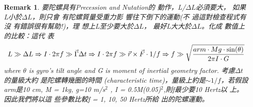 \documentclass[12pt,twoside]{article}
\newtheorem{remark}[theorem]{Remark}
\begin{document}
\begin{remark}
要陀螺具有Precession and Nutation的%
動作，L/$\Delta L$必須要大，%
如果L小於$\Delta L$，則只會%
有陀螺質量受重力影%
響往下倒下的運動(不%
過這對檢查程式有沒%
有錯誤很有幫助!)，理%
想上L至少要大於$\Delta L$，%
最好L大大於$\Delta L$。化成%
數值上的比較：這代%
表%
\begin{equation}
L\gg \Delta L\Rightarrow I\cdot 2\pi f\gg \vec{\Gamma}\Delta t\Rightarrow
I\cdot 2\pi f\gg \vec{r}\times \vec{F}\cdot 1/f\Rightarrow f\gg \sqrt{\frac{%
arm\cdot Mg\cdot \sin (\theta )}{2\pi I\cdot G}}
\end{equation}%
where $\theta $ is gyro's tilt angle and G is moment of inertial geometry
factor. 考慮$\Delta t$的量級大約%
是陀螺轉幾圈的時間%
(characteristic time)，量級上約是$\sim
1/f$，若假設arm是10 cm, M = 1kg, g=10 m/s$^{2}$%
, I = 0.5M(0.05)$^{2}$,則f最少要10 Hertz以%
上。因此我們將以這%
些參數比較f = 1, 10, 50 Hertz所給%
出的陀螺運動。
\end{remark}
\end{document}
